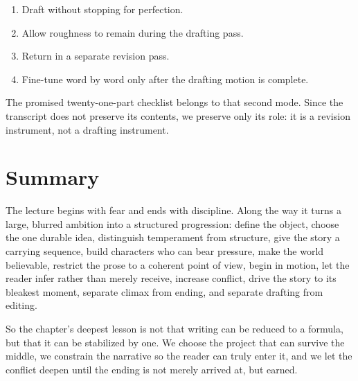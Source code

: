 \begin{enumerate}
\item Draft without stopping for perfection.
\item Allow roughness to remain during the drafting pass.
\item Return in a separate revision pass.
\item Fine-tune word by word only after the drafting motion is complete.
\end{enumerate}

The promised twenty-one-part checklist belongs to that second mode. Since the transcript does not preserve its contents, we preserve only its role: it is a revision instrument, not a drafting instrument.

\section{Summary}

The lecture begins with fear and ends with discipline. Along the way it turns a large, blurred ambition into a structured progression: define the object, choose the one durable idea, distinguish temperament from structure, give the story a carrying sequence, build characters who can bear pressure, make the world believable, restrict the prose to a coherent point of view, begin in motion, let the reader infer rather than merely receive, increase conflict, drive the story to its bleakest moment, separate climax from ending, and separate drafting from editing.

So the chapter's deepest lesson is not that writing can be reduced to a formula, but that it can be stabilized by one. We choose the project that can survive the middle, we constrain the narrative so the reader can truly enter it, and we let the conflict deepen until the ending is not merely arrived at, but earned.